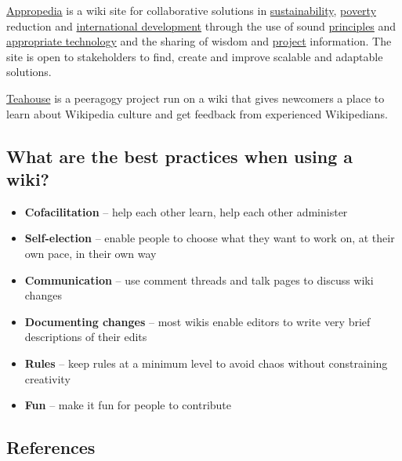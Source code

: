 \href{http://www.appropedia.org/Welcome\_to\_Appropedia}{Appropedia} is
a wiki site for collaborative solutions in
\href{http://www.appropedia.org/Sustainability}{sustainability},
\href{http://www.appropedia.org/Poverty}{poverty} reduction and
\href{http://www.appropedia.org/International\_development}{international
development} through the use of sound
\href{http://www.appropedia.org/Principles}{principles} and
\href{http://www.appropedia.org/Appropriate\_technology}{appropriate
technology} and the sharing of wisdom and
\href{http://www.appropedia.org/Project}{project} information. The site
is open to stakeholders to find, create and improve scalable and
adaptable solutions.

\href{http://en.wikipedia.org/wiki/Wikipedia:Teahouse}{Teahouse} is a
peeragogy project run on a wiki that gives newcomers a place to learn
about Wikipedia culture and get feedback from experienced Wikipedians.

\subsection{What are the best practices when using a wiki?}

\begin{itemize}
\item
  \textbf{Cofacilitation} -- help each other learn, help each other
  administer
\item
  \textbf{Self-election} -- enable people to choose what they want to
  work on, at their own pace, in their own way
\item
  \textbf{Communication} -- use comment threads and talk pages to
  discuss wiki changes
\item
  \textbf{Documenting changes} -- most wikis enable editors to write
  very brief descriptions of their edits
\item
  \textbf{Rules} -- keep rules at a minimum level to avoid chaos without
  constraining creativity
\item
  \textbf{Fun} -- make it fun for people to contribute
\end{itemize}
\subsection{References}

